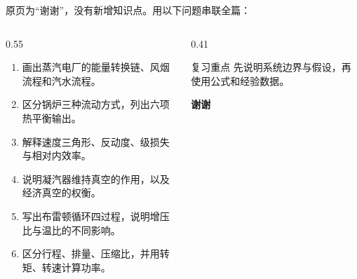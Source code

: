 \begin{frame}[t,shrink]{}
原页为“谢谢”，没有新增知识点。用以下问题串联全篇：
\begin{columns}[T,onlytextwidth]
\begin{column}{0.55\textwidth}
  \begin{enumerate}
    \item 画出蒸汽电厂的能量转换链、风烟流程和汽水流程。
    \item 区分锅炉三种流动方式，列出六项热平衡输出。
    \item 解释速度三角形、反动度、级损失与相对内效率。
    \item 说明凝汽器维持真空的作用，以及经济真空的权衡。
    \item 写出布雷顿循环四过程，说明增压比与温比的不同影响。
    \item 区分行程、排量、压缩比，并用转矩、转速计算功率。
  \end{enumerate}
\end{column}
\begin{column}{0.41\textwidth}
  \begin{keybox}{复习重点}
  \small 先说明系统边界与假设，再使用公式和经验数据。
  \end{keybox}
  \vspace{4mm}
  \begin{center}
  {\Huge\bfseries\textcolor{cprimary}{谢谢}}
  \end{center}
\end{column}
\end{columns}
\end{frame}
